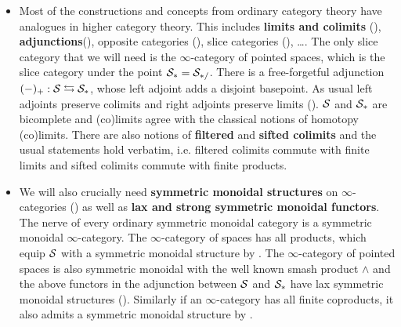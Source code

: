 \begin{itemize}
    \item Most of the constructions and concepts from ordinary category theory have analogues in higher category theory. This includes \textbf{limits and colimits} (\cite[Section~1.2.3, Chapter~4]{HigherToposTheory}), \textbf{adjunctions}(\cite[\href{https://kerodon.net/tag/02EJ}{Tag 02EJ}]{kerodon}), opposite categories (\cite[Section~1.2.1]{HigherToposTheory}), slice categories (\cite[Section~1.2.9]{HigherToposTheory}), \dots. The only slice category that we will need is the $\infty$-category of pointed spaces, which is the slice category under the point $\mathcal{S}_*=\mathcal{S}_{*/}$. There is a free-forgetful adjunction $(-)_+:\mathcal{S}\leftrightarrows \mathcal{S}_*$, whose left adjoint adds a disjoint basepoint. As usual left adjoints preserve colimits and right adjoints preserve limits (\cite[Proposition~5.2.3.5]{HigherToposTheory}). $\mathcal{S}$ and $\mathcal{S}_*$ are bicomplete and (co)limits agree with the classical notions of homotopy (co)limits. There are also notions of \textbf{filtered }and \textbf{sifted colimits }and the usual statements hold verbatim, i.e. filtered colimits commute with finite limits and sifted colimits commute with finite products.
    \item We will also crucially need \textbf{symmetric monoidal structures} on $\infty$-categories (\cite[Definition~2.0.0.7]{lurie2017higher}) as well as \textbf{lax and strong symmetric monoidal functors}. The nerve of every ordinary symmetric monoidal category is a symmetric monoidal $\infty$-category.
    The $\infty$-category of spaces has all products, which equip $\mathcal{S}$ with a symmetric monoidal structure by \cite[Section~2.4.1]{lurie2017higher}.
    The $\infty$-category of pointed spaces is also symmetric monoidal with the well known smash product $\wedge$ and the above functors in the adjunction between $\mathcal{S}$ and $\mathcal{S}_*$ have lax symmetric monoidal structures (\cite[Theorem~2.2.2.4]{lurie2017higher}). Similarly if an $\infty$-category has all finite coproducts, it also admits a symmetric monoidal structure by \cite[Section~2.4.3]{lurie2017higher}. 

\end{itemize}
